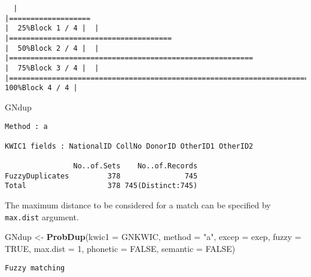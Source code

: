 \documentclass[
]{article}
\newenvironment{Shaded}{\begin{snugshade}}{\end{snugshade}}
\newcommand{\DataTypeTok}[1]{\textcolor[rgb]{0.13,0.29,0.53}{#1}}
\newcommand{\DecValTok}[1]{\textcolor[rgb]{0.00,0.00,0.81}{#1}}
\newcommand{\KeywordTok}[1]{\textcolor[rgb]{0.13,0.29,0.53}{\textbf{#1}}}
\newcommand{\NormalTok}[1]{#1}
\newcommand{\OtherTok}[1]{\textcolor[rgb]{0.56,0.35,0.01}{#1}}
\newcommand{\StringTok}[1]{\textcolor[rgb]{0.31,0.60,0.02}{#1}}
\begin{document}
\begin{verbatim}
  |                                                                                    |===================                                                         |  25%Block 1 / 4 |  |                                                                                    |======================================                                      |  50%Block 2 / 4 |  |                                                                                    |=========================================================                   |  75%Block 3 / 4 |  |                                                                                    |============================================================================| 100%Block 4 / 4 |
\end{verbatim}

\begin{Shaded}
\begin{Highlighting}[]
\NormalTok{GNdup}
\end{Highlighting}
\end{Shaded}

\begin{verbatim}
Method : a

KWIC1 fields : NationalID CollNo DonorID OtherID1 OtherID2
 
                No..of.Sets    No..of.Records
FuzzyDuplicates         378               745
Total                   378 745(Distinct:745)
\end{verbatim}

The maximum distance to be considered for a match can be specified by
\texttt{max.dist} argument.

\begin{Shaded}
\begin{Highlighting}[]
\NormalTok{GNdup <-}\StringTok{ }\KeywordTok{ProbDup}\NormalTok{(}\DataTypeTok{kwic1 =}\NormalTok{ GNKWIC, }\DataTypeTok{method =} \StringTok{"a"}\NormalTok{, }\DataTypeTok{excep =}\NormalTok{ exep, }
                 \DataTypeTok{fuzzy =} \OtherTok{TRUE}\NormalTok{, }\DataTypeTok{max.dist =} \DecValTok{1}\NormalTok{,}
                 \DataTypeTok{phonetic =} \OtherTok{FALSE}\NormalTok{, }\DataTypeTok{semantic =} \OtherTok{FALSE}\NormalTok{)}
\end{Highlighting}
\end{Shaded}

\begin{verbatim}
Fuzzy matching
\end{verbatim}
\end{document}

